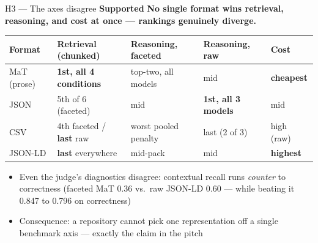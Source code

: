 \documentclass[aspectratio=169,10pt]{beamer}
\newcommand{\verdict}[1]{\textcolor{good}{\textbf{#1}}}
\begin{document}
\begin{frame}{H3 --- The axes disagree \hfill \verdict{Supported}}
  \textbf{No single format wins retrieval, reasoning, and cost at once --- rankings genuinely diverge.}
  \bigskip
  \begin{center}
  \renewcommand{\arraystretch}{1.4}
  \small
  \begin{tabular}{@{}lllll@{}}
    \toprule
    Format & Retrieval (chunked) & Reasoning, faceted & Reasoning, raw & Cost \\
    \midrule
    MaT (prose) & \textbf{1st, all 4 conditions} & top-two, all models & mid & \textbf{cheapest} \\
    JSON & 5th of 6 (faceted) & mid & \textbf{1st, all 3 models} & mid \\
    CSV & 4th faceted / \textbf{last} raw & worst pooled penalty & last (2 of 3) & high (raw) \\
    JSON-LD & \textbf{last} everywhere & mid-pack & mid & \textbf{highest} \\
    \bottomrule
  \end{tabular}
  \end{center}
  \bigskip
  \begin{itemize}
    \item Even the judge's diagnostics disagree: contextual recall runs \textit{counter} to correctness
      (faceted MaT 0.36 vs.\ raw JSON-LD 0.60 --- while beating it 0.847 to 0.796 on correctness)
    \item Consequence: a repository cannot pick one representation off a single benchmark axis ---
      exactly the claim in the pitch
  \end{itemize}
\end{frame}
\end{document}
